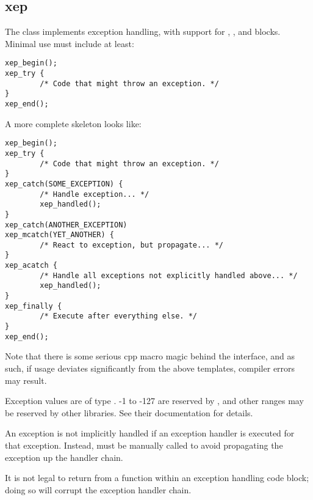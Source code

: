 %
%
%
%
%              

\subsection{xep}
\label{xep}
The  class implements exception handling, with support for
, , and  blocks.
Minimal use must include at least:
\begin{verbatim}
xep_begin();
xep_try {
        /* Code that might throw an exception. */
}
xep_end();
\end{verbatim}

A more complete skeleton looks like:
\begin{verbatim}
xep_begin();
xep_try {
        /* Code that might throw an exception. */
}
xep_catch(SOME_EXCEPTION) {
        /* Handle exception... */
        xep_handled();
}
xep_catch(ANOTHER_EXCEPTION)
xep_mcatch(YET_ANOTHER) {
        /* React to exception, but propagate... */
}
xep_acatch {
        /* Handle all exceptions not explicitly handled above... */
        xep_handled();
}
xep_finally {
        /* Execute after everything else. */
}
xep_end();
\end{verbatim}

Note that there is some serious cpp macro magic behind the 
interface, and as such, if usage deviates significantly from the above
templates, compiler errors may result.

Exception values are of type .  -1 to -127 are reserved by
, and other ranges may be reserved by other libraries.  See
their documentation for details.

An exception is not implicitly handled if an exception handler is executed for
that exception.  Instead,  must be manually called to
avoid propagating the exception up the handler chain.

It is not legal to return from a function within an exception handling code
block; doing so will corrupt the exception handler chain.

